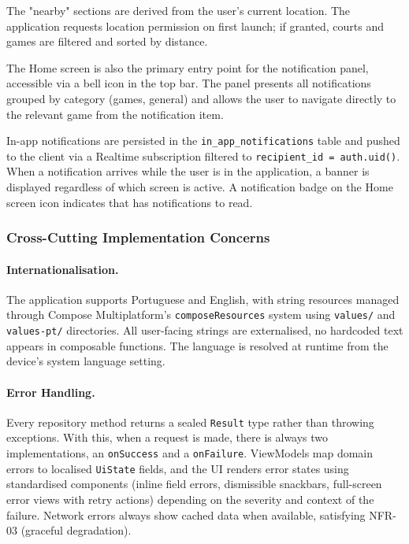 The "nearby" sections are derived from the user's current location.
The application requests location permission on first launch; if granted, courts and games are filtered and sorted by distance.

The Home screen is also the primary entry point for the notification panel, accessible via a bell icon in the top bar.
The panel presents all notifications grouped by category (games, general) and allows the user to navigate directly to the relevant game from the notification item.

In-app notifications are persisted in the \texttt{in\_app\_notifications} table and pushed to the client via a Realtime subscription filtered to \texttt{recipient\_id = auth.uid()}.
When a notification arrives while the user is in the application, a banner is displayed regardless of which screen is active.
A notification badge on the Home screen icon indicates that has notifications to read.

\subsubsection{Cross-Cutting Implementation Concerns}


\paragraph{Internationalisation.}
The application supports Portuguese and English, with string resources managed through Compose Multiplatform's \texttt{composeResources} system using \texttt{values/} and \texttt{values-pt/} directories.
All user-facing strings are externalised, no hardcoded text appears in composable functions.
The language is resolved at runtime from the device's system language setting.

\paragraph{Error Handling.}
Every repository method returns a sealed \texttt{Result} type rather than throwing exceptions.
With this, when a request is made, there is always two implementations, an \texttt{onSuccess} and a \texttt{onFailure}. 
ViewModels map domain errors to localised \texttt{UiState} fields, and the UI renders error states using standardised components (inline field errors, dismissible snackbars, full-screen error views with retry actions) depending on the severity and context of the failure.
Network errors always show cached data when available, satisfying NFR-03 (graceful degradation).

